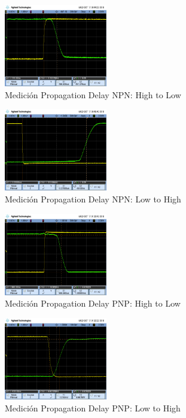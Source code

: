 \begin{multicols}{2}
\begin{figure}[H]
  \centering
    \includegraphics[width=0.4\textwidth]{ejercicio1/pHL-NPN}
    \caption{Medición Propagation Delay NPN: High to Low} %
\end{figure}

\begin{figure}[H]
  \centering
    \includegraphics[width=0.4\textwidth]{ejercicio1/pLH-NPN}
    \caption{Medición Propagation Delay NPN: Low to High} %
\end{figure}

\begin{figure}[H]
  \centering
    \includegraphics[width=0.4\textwidth]{ejercicio1/pHL-PNP}
    \caption{Medición Propagation Delay PNP: High to Low} %
\end{figure}

\begin{figure}[H]
  \centering
    \includegraphics[width=0.4\textwidth]{ejercicio1/pLH-PNP}
    \caption{Medición Propagation Delay PNP: Low to High} %
\end{figure}


\end{multicols}
